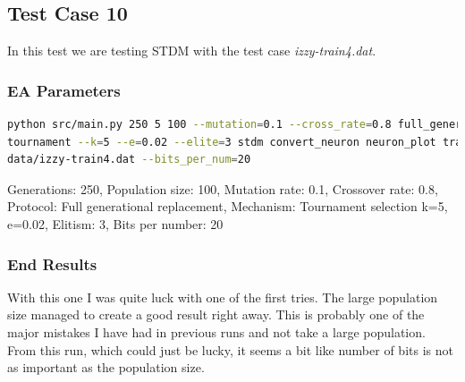 \subsection{Test Case 10}\label{sec:test-case-11}
In this test we are testing STDM with the test case
\textit{izzy-train4.dat}.
\subsubsection{EA Parameters}\label{sec:test-case-11-parameters}
\begin{lstlisting}[frame=single, language=bash, caption=Command-line to
replicate the results]
python src/main.py 250 5 100 --mutation=0.1 --cross_rate=0.8 full_generational
tournament --k=5 --e=0.02 --elite=3 stdm convert_neuron neuron_plot training\
data/izzy-train4.dat --bits_per_num=20
\end{lstlisting}
Generations: 250, Population size: 100, Mutation rate: 0.1, Crossover rate: 0.8, Protocol: Full generational replacement, Mechanism: Tournament selection k=5, e=0.02, Elitism: 3, Bits per number: 20
\subsubsection{End Results}\label{sec:test-case-10-results}
With this one I was quite luck with one of the first tries. The large population
size managed to create a good result right away. This is probably one of the
major mistakes I have had in previous runs and not take a large population. From
this run, which could just be lucky, it seems a bit like number of bits is not
as important as the population size.

